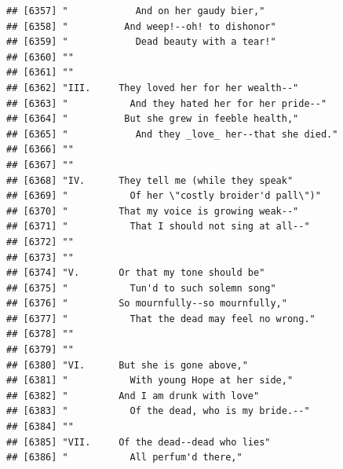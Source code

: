 \documentclass{article}\usepackage[]{graphicx}\usepackage[]{color}
\makeatletter
\newenvironment{kframe}{%
 \def\at@end@of@kframe{}%
 \ifinner\ifhmode%
  \def\at@end@of@kframe{\end{minipage}}%
  \begin{minipage}{\columnwidth}%
 \fi\fi%
 \def\FrameCommand##1{\hskip\@totalleftmargin \hskip-\fboxsep
 \colorbox{shadecolor}{##1}\hskip-\fboxsep
     \hskip-\linewidth \hskip-\@totalleftmargin \hskip\columnwidth}%
 \MakeFramed {\advance\hsize-\width
   \@totalleftmargin\z@ \linewidth\hsize
   \@setminipage}}%
 {\par\unskip\endMakeFramed%
 \at@end@of@kframe}
\newenvironment{knitrout}{}{} %
\makeatother
\begin{document}
\begin{knitrout}
\begin{kframe}
\begin{verbatim}
## [6357] "            And on her gaudy bier,"                                          
## [6358] "          And weep!--oh! to dishonor"                                        
## [6359] "            Dead beauty with a tear!"                                        
## [6360] ""                                                                            
## [6361] ""                                                                            
## [6362] "III.     They loved her for her wealth--"                                    
## [6363] "           And they hated her for her pride--"                               
## [6364] "          But she grew in feeble health,"                                    
## [6365] "            And they _love_ her--that she died."                             
## [6366] ""                                                                            
## [6367] ""                                                                            
## [6368] "IV.      They tell me (while they speak"                                     
## [6369] "           Of her \"costly broider'd pall\")"                                
## [6370] "         That my voice is growing weak--"                                    
## [6371] "           That I should not sing at all--"                                  
## [6372] ""                                                                            
## [6373] ""                                                                            
## [6374] "V.       Or that my tone should be"                                          
## [6375] "           Tun'd to such solemn song"                                        
## [6376] "         So mournfully--so mournfully,"                                      
## [6377] "           That the dead may feel no wrong."                                 
## [6378] ""                                                                            
## [6379] ""                                                                            
## [6380] "VI.      But she is gone above,"                                             
## [6381] "           With young Hope at her side,"                                     
## [6382] "         And I am drunk with love"                                           
## [6383] "           Of the dead, who is my bride.--"                                  
## [6384] ""                                                                            
## [6385] "VII.     Of the dead--dead who lies"                                         
## [6386] "           All perfum'd there,"                                              

\end{verbatim}
\end{kframe}
\end{knitrout}
\end{document}
